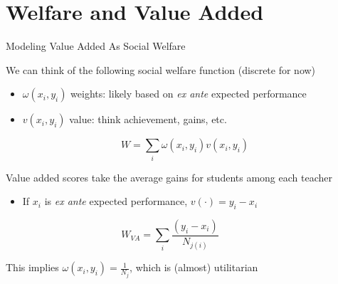 \documentclass[t,aspectratio=169,11pt]{beamer}
\newenvironment{wideitemize}{\itemize\addtolength{\itemsep}{14pt}}{\enditemize}
\begin{document}
\section{Welfare and Value Added}


\begin{frame}{Modeling Value Added As Social Welfare}

\begin{wideitemize}
    \item We can think of the following social welfare function (discrete for now)
    \begin{itemize}
        \item $\omega(x_i,y_i)$ weights: likely based on \textit{ex ante} expected performance
        \item $v(x_i,y_i)$ value: think achievement, gains, etc.
    \end{itemize}
    \[
    W  = \sum_i \omega(x_i,y_i) v(x_i,y_i) 
    \] 
    
    \item Value added scores take the average gains for students among each teacher
    \begin{itemize}
        \item If $x_i$ is \textit{ex ante} expected performance, $v(\cdot) = y_i - x_i$
    \end{itemize}
    \[
    W_{VA}  = \sum_i \frac{(y_i-x_i)}{N_{j(i)}} \hspace{3em}
    \]
    
    \item This implies $\omega(x_i,y_i)=\frac{1}{N_j}$, which is (almost) utilitarian
    
    
\end{wideitemize}


\end{frame}
\end{document}
